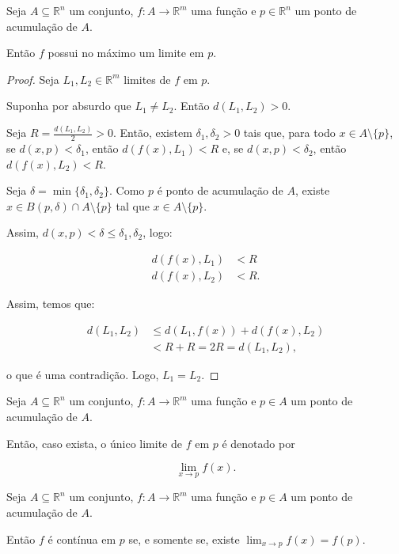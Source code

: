 \begin{proposition}
    Seja $A\subseteq \mathbb R^n$ um conjunto, $f: A \to \mathbb R^m$ uma função e $p \in \mathbb R^n$ um ponto de acumulação de $A$.

    Então $f$ possui no máximo um limite em $p$.
\end{proposition}

\begin{proof}
    Seja $L_1, L_2 \in \mathbb R^m$ limites de $f$ em $p$.

    Suponha por absurdo que $L_1\neq L_2$. Então $d(L_1, L_2) > 0$.

    Seja $R=\frac{d(L_1, L_2)}{2} > 0$. Então, existem $\delta_1, \delta_2 > 0$ tais que, para todo $x \in A\setminus\{p\}$, se $d(x, p) < \delta_1$, então $d(f(x), L_1) < R$ e, se $d(x, p) < \delta_2$, então $d(f(x), L_2) < R$.

    Seja $\delta = \min\{\delta_1, \delta_2\}$.
    Como $p$ é ponto de acumulação de $A$, existe $x \in B(p, \delta)\cap A\setminus \{p\}$ tal que $x \in A\setminus\{p\}$.
    
    Assim, $d(x, p)<\delta\leq \delta_1, \delta_2$, logo:

    \begin{align*}
        d(f(x), L_1) &< R \\
        d(f(x), L_2) &< R.
    \end{align*}

    Assim, temos que:

    \begin{align*}
        d(L_1, L_2) &\leq d(L_1, f(x)) + d(f(x), L_2) \\
        &< R + R = 2R = d(L_1, L_2),
    \end{align*}

    o que é uma contradição. Logo, $L_1 = L_2$.
\end{proof}
\begin{definition}
    Seja $A\subseteq \mathbb R^n$ um conjunto, $f: A \to \mathbb R^m$ uma função e $p \in A$ um ponto de acumulação de $A$.

    Então, caso exista, o único limite de $f$ em $p$ é denotado por
    
    \begin{equation*}
    \lim_{x\to p} f(x).
    \end{equation*}
\end{definition}

\begin{proposition}
    Seja $A\subseteq \mathbb R^n$ um conjunto, $f: A \to \mathbb R^m$ uma função e $p \in A$ um ponto de acumulação de $A$.

    Então $f$ é contínua em $p$ se, e somente se, existe $\lim_{x\to p} f(x) = f(p)$.
\end{proposition}

